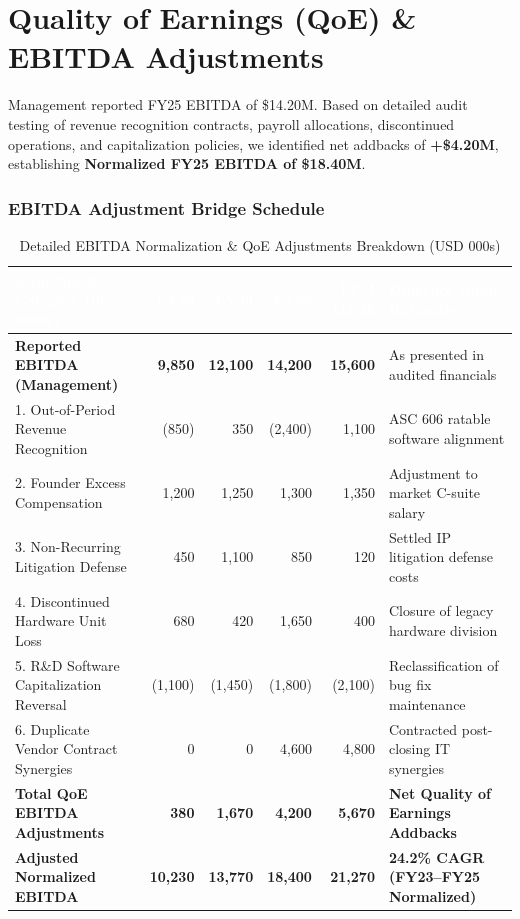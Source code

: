 \documentclass[10pt,a4paper,oneside]{scrreprt}
\newcommand{\tablehdr}[1]{\fontseries{b}\selectfont\textcolor{white}{#1}}
\begin{document}
\clearpage

\chapter{Quality of Earnings (QoE) \& EBITDA Adjustments}

Management reported FY25 EBITDA of \$14.20M. Based on detailed audit testing of revenue recognition contracts, payroll allocations, discontinued operations, and capitalization policies, we identified net addbacks of \textbf{+\$4.20M}, establishing \textbf{Normalized FY25 EBITDA of \$18.40M}.

\subsection*{EBITDA Adjustment Bridge Schedule}

\begin{table}[H]
\centering
\fontsize{8.5}{10.5}\selectfont
\renewcommand{\arraystretch}{1.02}
\begin{tabularx}{\textwidth}{L r r r r L}
\hline
{}
\tablehdr{Adjustment Category (in \$000s)} & \tablehdr{FY23} & \tablehdr{FY24} & \tablehdr{FY25} & \tablehdr{LTM Q2-26} & \tablehdr{Diligence Audit Rationale} \\
\hline
\textbf{Reported EBITDA (Management)} & \textbf{9,850} & \textbf{12,100} & \textbf{14,200} & \textbf{15,600} & As presented in audited financials \\
. Out-of-Period Revenue Recognition & (850) & 350 & (2,400) & 1,100 & ASC 606 ratable software alignment \\
2. Founder Excess Compensation & 1,200 & 1,250 & 1,300 & 1,350 & Adjustment to market C-suite salary \\
3. Non-Recurring Litigation Defense & 450 & 1,100 & 850 & 120 & Settled IP litigation defense costs \\
4. Discontinued Hardware Unit Loss & 680 & 420 & 1,650 & 400 & Closure of legacy hardware division \\
5. R\&D Software Capitalization Reversal & (1,100) & (1,450) & (1,800) & (2,100) & Reclassification of bug fix maintenance \\
6. Duplicate Vendor Contract Synergies & 0 & 0 & 4,600 & 4,800 & Contracted post-closing IT synergies \\
\hline
{}
\textbf{Total QoE EBITDA Adjustments} & \textbf{380} & \textbf{1,670} & \textbf{4,200} & \textbf{5,670} & \textbf{Net Quality of Earnings Addbacks} \\
\hline
{}
\textbf{Adjusted Normalized EBITDA} & \textbf{10,230} & \textbf{13,770} & \textbf{18,400} & \textbf{21,270} & \textbf{24.2\% CAGR (FY23--FY25 Normalized)} \\
\hline
\end{tabularx}
\caption{Detailed EBITDA Normalization \& QoE Adjustments Breakdown (USD 000s)}
\end{table}
\end{document}
